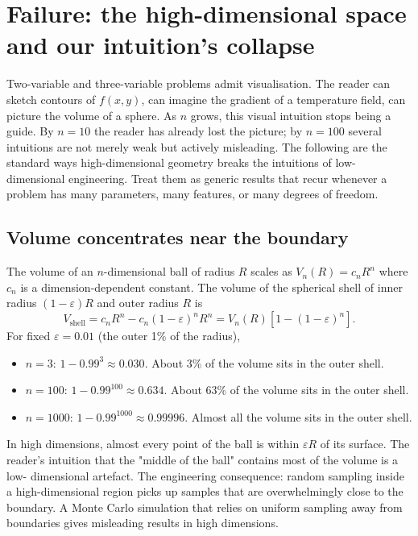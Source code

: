 \section{Failure: the high-dimensional space and our intuition's
collapse}

Two-variable and three-variable problems admit visualisation. The
reader can sketch contours of $f(x, y)$, can imagine the gradient
of a temperature field, can picture the volume of a sphere. As
$n$ grows, this visual intuition stops being a guide. By $n = 10$
the reader has already lost the picture; by $n = 100$ several
intuitions are not merely weak but actively misleading. The
following are the standard ways high-dimensional geometry breaks
the intuitions of low-dimensional engineering. Treat them as
generic results that recur whenever a problem has many parameters,
many features, or many degrees of freedom.

\subsection{Volume concentrates near the boundary}

The volume of an $n$-dimensional ball of radius $R$ scales as
$V_{n}(R) = c_{n} R^{n}$ where $c_{n}$ is a dimension-dependent
constant. The volume of the spherical shell of inner radius
$(1 - \varepsilon) R$ and outer radius $R$ is
\[
V_{\text{shell}} = c_{n} R^{n} - c_{n} (1 - \varepsilon)^{n} R^{n}
= V_{n}(R)\left[1 - (1 - \varepsilon)^{n}\right].
\]
For fixed $\varepsilon = 0.01$ (the outer 1\% of the radius),
\begin{itemize}[leftmargin=*]
  \item $n = 3$: $1 - 0.99^{3} \approx 0.030$. About 3\% of the
    volume sits in the outer shell.
  \item $n = 100$: $1 - 0.99^{100} \approx 0.634$. About 63\% of
    the volume sits in the outer shell.
  \item $n = 1000$: $1 - 0.99^{1000} \approx 0.99996$. Almost all
    the volume sits in the outer shell.
\end{itemize}
In high dimensions, almost every point of the ball is within
$\varepsilon R$ of its surface. The reader's intuition that the
"middle of the ball" contains most of the volume is a low-
dimensional artefact. The engineering consequence: random sampling
inside a high-dimensional region picks up samples that are
overwhelmingly close to the boundary. A Monte Carlo simulation that
relies on uniform sampling away from boundaries gives misleading
results in high dimensions.

